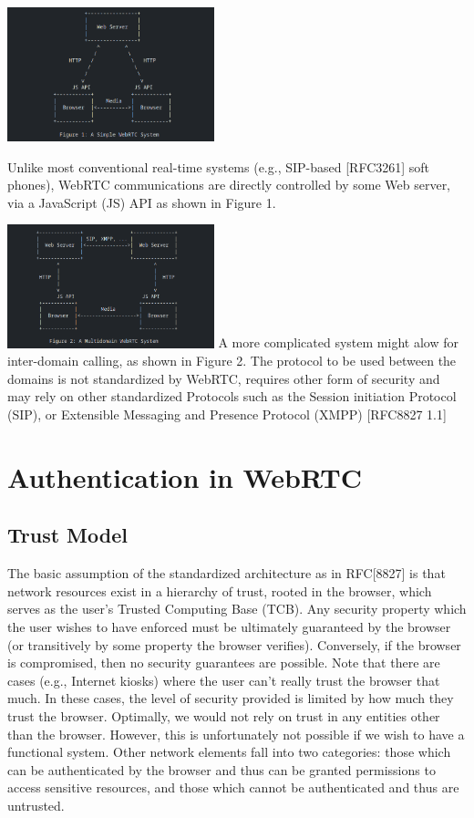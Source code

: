 \documentclass[conference]{IEEEtran}
\begin{document}
\includegraphics[width=0.45\textwidth]{WebRTC basic Structure}

Unlike most conventional real-time systems (e.g., SIP-based [RFC3261] soft phones), WebRTC 
communications are directly controlled by some Web server, via a JavaScript (JS) API as shown in Figure 1.


\includegraphics[width=0.45\textwidth]{multi domain calling.png}
A more complicated system might alow for inter-domain calling, as shown in Figure 2. The protocol to be used between the domains 
is not standardized by WebRTC, requires other form of security and may rely on other standardized Protocols such as the
Session initiation Protocol (SIP), or Extensible Messaging and Presence Protocol (XMPP) [RFC8827 1.1]

\section{Authentication in WebRTC}
\subsection{Trust Model}

The basic assumption of the standardized architecture as in RFC[8827] is that network resources exist in a hierarchy of trust, rooted in the browser, 
which serves as the user's Trusted Computing Base (TCB). Any security property which the user wishes to have enforced must be 
ultimately guaranteed by the browser (or transitively by some property the browser verifies). Conversely, if the browser is 
compromised, then no security guarantees are possible. Note that there are cases (e.g., Internet kiosks) where the user can't 
really trust the browser that much. In these cases, the level of security provided is limited by how much they trust the browser.
Optimally, we would not rely on trust in any entities other than the browser. However, this is unfortunately not possible 
if we wish to have a functional system. Other network elements fall into two categories: those which can be authenticated by 
the browser and thus can be granted permissions to access sensitive resources, and those which cannot be authenticated and 
thus are untrusted.
\end{document}
